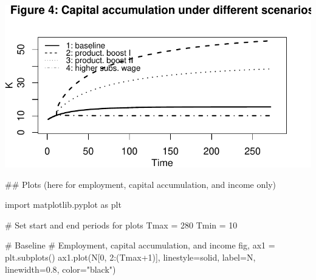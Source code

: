 \documentclass[
  letterpaper,
  DIV=11,
  numbers=noendperiod]{scrreprt}
\newenvironment{Shaded}{\begin{snugshade}}{\end{snugshade}}
\newcommand{\CommentTok}[1]{\textcolor[rgb]{0.37,0.37,0.37}{#1}}
\newcommand{\DecValTok}[1]{\textcolor[rgb]{0.68,0.00,0.00}{#1}}
\newcommand{\FloatTok}[1]{\textcolor[rgb]{0.68,0.00,0.00}{#1}}
\newcommand{\ImportTok}[1]{\textcolor[rgb]{0.00,0.46,0.62}{#1}}
\newcommand{\NormalTok}[1]{\textcolor[rgb]{0.00,0.23,0.31}{#1}}
\newcommand{\OperatorTok}[1]{\textcolor[rgb]{0.37,0.37,0.37}{#1}}
\newcommand{\StringTok}[1]{\textcolor[rgb]{0.13,0.47,0.30}{#1}}
\begin{document}
\includegraphics{a_ricardian_one_sector_model_files/figure-pdf/ricardo1_3-1.pdf}

\begin{tcolorbox}[enhanced jigsaw, titlerule=0mm, breakable, bottomrule=.15mm, toprule=.15mm, colbacktitle=quarto-callout-note-color!10!white, rightrule=.15mm, toptitle=1mm, opacityback=0, left=2mm, coltitle=black, title=\textcolor{quarto-callout-note-color}{\faInfo}\hspace{0.5em}{Python code}, colframe=quarto-callout-note-color-frame, opacitybacktitle=0.6, leftrule=.75mm, bottomtitle=1mm, arc=.35mm, colback=white]

\begin{Shaded}
\begin{Highlighting}[]
\CommentTok{\#\# Plots (here for employment, capital accumulation, and income only)}

\ImportTok{import}\NormalTok{ matplotlib.pyplot }\ImportTok{as}\NormalTok{ plt}

\CommentTok{\# Set start and end periods for plots}
\NormalTok{Tmax }\OperatorTok{=} \DecValTok{280}
\NormalTok{Tmin }\OperatorTok{=} \DecValTok{10}

\CommentTok{\# Baseline}
\CommentTok{\# Employment, capital accumulation, and income}
\NormalTok{fig, ax1 }\OperatorTok{=}\NormalTok{ plt.subplots()}
\NormalTok{ax1.plot(N[}\DecValTok{0}\NormalTok{, }\DecValTok{2}\NormalTok{:(Tmax}\OperatorTok{+}\DecValTok{1}\NormalTok{)], linestyle}\OperatorTok{=}\StringTok{\textquotesingle{}solid\textquotesingle{}}\NormalTok{, label}\OperatorTok{=}\StringTok{\textquotesingle{}N\textquotesingle{}}\NormalTok{, linewidth}\OperatorTok{=}\FloatTok{0.8}\NormalTok{, color}\OperatorTok{=}\StringTok{"black"}\NormalTok{)}


\end{Highlighting}
\end{Shaded}
\end{tcolorbox}
\end{document}
